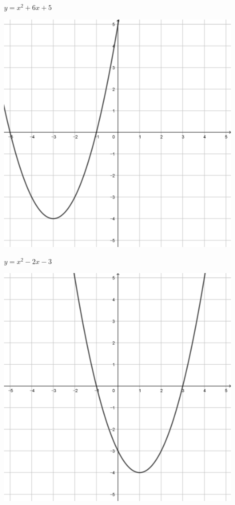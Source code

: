 \documentclass[a4paper]{oblivoir}
\begin{document}
\begin{minipage}{0.45\textwidth}\centering
\(y=x^2+6x+5\)
\par\bigskip\includegraphics[width=0.9\textwidth]{img/10-5}
\end{minipage}
\begin{minipage}{0.45\textwidth}\centering
\(y=x^2-2x-3\)
\par\bigskip\includegraphics[width=0.9\textwidth]{img/10-6}
\end{minipage}\bigskip\bigskip\par
\end{document}

